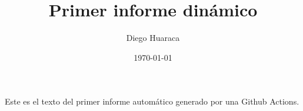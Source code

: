 \documentclass[12pt, a4paper]{book}
\title{Primer informe dinámico}
\author{Diego Huaraca}
\date{\today}
\begin{document}
\maketitle

Este es el texto del primer informe automático generado por una Github Actions.
\end{document}
